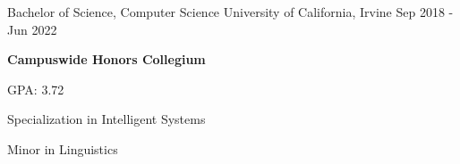 
\begin{cventries}
  \cventry
    {Bachelor of Science, Computer Science} %
    {University of California, Irvine} %
    {} %
    {Sep 2018 - Jun 2022} %
    {
      \begin {cvitems}
        \item{\textbf{Campuswide Honors Collegium}}
        \item{GPA: 3.72}
        \item{Specialization in Intelligent Systems}
        \item{Minor in Linguistics}
      \end{cvitems}
    }
\end{cventries}
